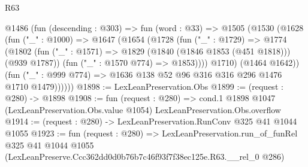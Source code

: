 \begin{lexlean}{R63}
\begin{coremodule}
      @1486
        (fun (descending : @303) =>
        fun (word : @33) =>
        @1505
          (@1530
            (@1628
              (fun ("_" : @1000) =>
              @1647
                (@1654
                  (@1728
                    (fun ("_" : @1729) =>
                    @1774
                      (@1802
                        (fun ("_" : @1571) => @1829 (@1840 (@1846 @1853 (@451 @1818))) (@939 @1787))
                        (fun ("_" : @1570 @774) => @1853))))
                  @1710)
                (@1464 @1642))
              (fun ("_" : @999 @774) => @1636 @138 @52 @96 @316 @316 @296 @1476 @1710 @1479))))))
@1898 := LexLeanPreservation.Obs
@1899 := (request : @280) -> @1898
@1908 := fun (request : @280) =>
  cond.{1} @1898 @1047 (LexLeanPreservation.Obs.value @1054) LexLeanPreservation.Obs.overflow
@1914 := (request : @280) -> LexLeanPreservation.RunConv @325 @41 @1044 @1055
@1923 := fun (request : @280) =>
  LexLeanPreservation.run_of_funRel
    @325
    @41
    @1044
    @1055
    (LexLeanPreserve.Ccc362dd0d0b76b7c46f93f7f38ec125e.R63.__rel_0 @286)
\end{coremodule}
\end{lexlean}
